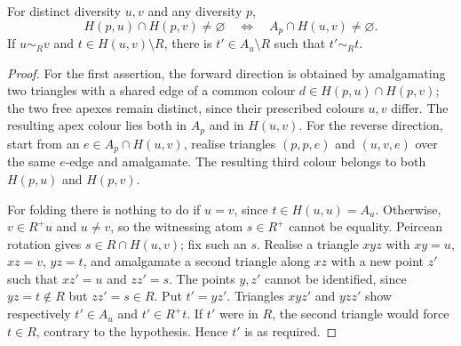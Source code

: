 \begin{lemma}\label{lem:rh-fold}
For distinct diversity $u,v$ and any diversity $p$,
\[
 H(p,u)\cap H(p,v)\ne\varnothing
 \quad\Longleftrightarrow\quad
 A_p\cap H(u,v)\ne\varnothing.
\]
If $u\sim_R v$ and $t\in H(u,v)\setminus R$, there is
$t'\in A_u\setminus R$ such that $t'\sim_R t$.
\end{lemma}
\begin{proof}
For the first assertion, the forward direction is obtained by
amalgamating two triangles with a shared edge of a common colour
$d\in H(p,u)\cap H(p,v)$; the two free apexes remain distinct,
since their prescribed colours $u,v$ differ. The resulting apex
colour lies both in $A_p$ and in $H(u,v)$. For the reverse direction,
start from an $e\in A_p\cap H(u,v)$, realise triangles $(p,p,e)$ and
$(u,v,e)$ over the same $e$-edge and amalgamate. The resulting
third colour belongs to both $H(p,u)$ and $H(p,v)$.

For folding there is nothing to do if $u=v$, since
$t\in H(u,u)=A_u$. Otherwise, $v\in R^+u$ and $u\ne v$, so the witnessing
atom $s\in R^+$ cannot be equality. Peircean rotation
gives $s\in R\cap H(u,v)$; fix such an $s$.
Realise a triangle $xyz$ with $xy=u$, $xz=v$, $yz=t$, and
amalgamate a second triangle along $xz$ with a new point $z'$ such
that $xz'=u$ and $zz'=s$. The points $y,z'$ cannot be identified,
since $yz=t\notin R$ but $zz'=s\in R$. Put $t'=yz'$.
Triangles $xyz'$ and $yzz'$ show respectively $t'\in A_u$ and
$t'\in R^+t$. If $t'$ were in $R$, the second triangle would force
$t\in R$, contrary to the hypothesis. Hence $t'$ is as required.
\end{proof}

